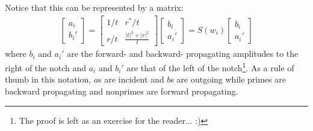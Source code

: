 \documentclass[10pt, letter, oneside,graphicx]{article}
\begin{document}
\begin{center}
\end{center}
Notice that this can be represented by a matrix:
\begin{align*}
\left[ \begin{array}{c}
a_i \\ b_i'
\end{array} \right]
=
\left[ \begin{array}{cc}
1/t & r^*/t \\
r/t & \frac{|t|^2 + |r|^2}{t}
\end{array} \right]
\left[ \begin{array}{c}
b_i \\ a_i'
\end{array} \right]
=
S(w_i)
\left[ \begin{array}{c}
b_i \\ a_i'
\end{array} \right]
\end{align*}
where $b_i$ and $a_i'$ are the forward- and backward- propagating amplitudes to the right of the notch and $a_i$ and $b_i'$ are that of the left of the notch\footnote{The proof is left as an exercise for the reader... :)}. As a rule of thumb in this notation, $a$s are incident and $b$s are outgoing while primes are backward propagating and nonprimes are forward propagating.
\end{document}
